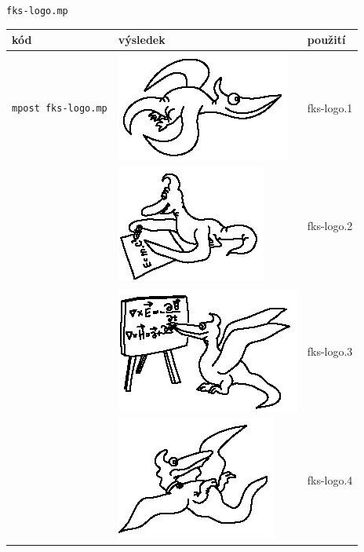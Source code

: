 \documentclass[a4paper,10pt]{article}
\begin{document}
{\centering\large\texttt{fks-logo.mp}\nopagebreak\\\vspace{-12pt}\noindent}
\begin{tabularx}{\textwidth}{|l|l|X|}\hline
    kód & výsledek & použití\\\hline
    \verb+mpost fks-logo.mp+&\includegraphics{fks-logo_1}& fks-logo.1
{} {} {} {} {} {} {} {} {} {} {} {} {} {} {} {} {} {} {} {} {} {} {} {} {} {} {} {} {} {} {} {} {} {} {} {} {} {} {} {} {} {} {} {} {} {} {} {} {} {} {} {} {} {} {} {} {} {} {} {} {} {} {} {} {} {} {} {} {} {} {} {} {} {} {} {} {} {} {} {} {} {} {} {} {} {} {} {} {} {} {} {} {} {} {} {} {} {} {} {} {} {} {} {} {} {} {} {} {} {} {} {} {} {} {} {} {} {} {} {} {} {} {} {} {} {} {} {}
\\\hline
    &\includegraphics{fks-logo_2}& fks-logo.2\\\hline
    &\includegraphics{fks-logo_3}& fks-logo.3\\\hline
    &\includegraphics{fks-logo_4}& fks-logo.4\\\hline

\end{tabularx}
\end{document}
